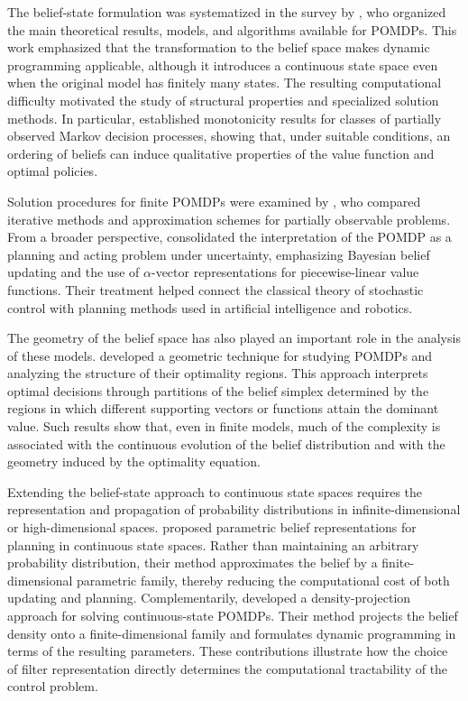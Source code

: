 \documentclass[10pt,twocolumn]{article}
\theoremstyle{remark}
\begin{document}
The belief-state formulation was systematized in the survey by \citet{Monahan1982POMDPSurvey}, who organized the main theoretical results, models, and algorithms available for POMDPs. This work emphasized that the transformation to the belief space makes dynamic programming applicable, although it introduces a continuous state space even when the original model has finitely many states. The resulting computational difficulty motivated the study of structural properties and specialized solution methods. In particular, \citet{Lovejoy1987MonotonicityPOMDP} established monotonicity results for classes of partially observed Markov decision processes, showing that, under suitable conditions, an ordering of beliefs can induce qualitative properties of the value function and optimal policies.

Solution procedures for finite POMDPs were examined by \citet{WhiteScherer1989SolutionProceduresPOMDP}, who compared iterative methods and approximation schemes for partially observable problems. From a broader perspective, \citet{KaelblingLittmanCassandra1998POMDP} consolidated the interpretation of the POMDP as a planning and acting problem under uncertainty, emphasizing Bayesian belief updating and the use of $\alpha$-vector representations for piecewise-linear value functions. Their treatment helped connect the classical theory of stochastic control with planning methods used in artificial intelligence and robotics.

The geometry of the belief space has also played an important role in the analysis of these models. \citet{Zhang2010GeometricPOMDP} developed a geometric technique for studying POMDPs and analyzing the structure of their optimality regions. This approach interprets optimal decisions through partitions of the belief simplex determined by the regions in which different supporting vectors or functions attain the dominant value. Such results show that, even in finite models, much of the complexity is associated with the continuous evolution of the belief distribution and with the geometry induced by the optimality equation.

Extending the belief-state approach to continuous state spaces requires the representation and propagation of probability distributions in infinite-dimensional or high-dimensional spaces. \citet{BrooksMakarenkoWilliamsDurrantWhyte2006ParametricPOMDP} proposed parametric belief representations for planning in continuous state spaces. Rather than maintaining an arbitrary probability distribution, their method approximates the belief by a finite-dimensional parametric family, thereby reducing the computational cost of both updating and planning. Complementarily, \citet{ZhouFuMarcus2010ContinuousStatePOMDP} developed a density-projection approach for solving continuous-state POMDPs. Their method projects the belief density onto a finite-dimensional family and formulates dynamic programming in terms of the resulting parameters. These contributions illustrate how the choice of filter representation directly determines the computational tractability of the control problem.
\end{document}
